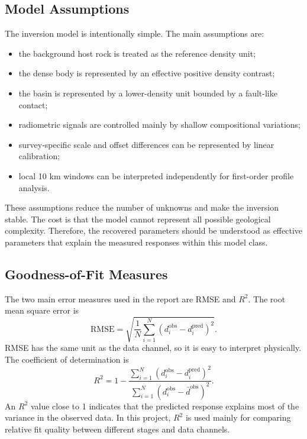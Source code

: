 \documentclass[12pt,a4paper]{article}
\begin{document}
\subsection{Model Assumptions}
The inversion model is intentionally simple. The main assumptions are:
\begin{itemize}
    \item the background host rock is treated as the reference density unit;
    \item the dense body is represented by an effective positive density contrast;
    \item the basin is represented by a lower-density unit bounded by a fault-like contact;
    \item radiometric signals are controlled mainly by shallow compositional variations;
    \item survey-specific scale and offset differences can be represented by linear calibration;
    \item local 10 km windows can be interpreted independently for first-order profile analysis.
\end{itemize}
These assumptions reduce the number of unknowns and make the inversion stable. The cost is that the model cannot represent all possible geological complexity. Therefore, the recovered parameters should be understood as effective parameters that explain the measured responses within this model class.

\subsection{Goodness-of-Fit Measures}
The two main error measures used in the report are RMSE and $R^2$. The root mean square error is
\begin{equation}
    \mathrm{RMSE}
    =
    \sqrt{
    \frac{1}{N}
    \sum_{i=1}^{N}
    \left(d_i^{\mathrm{obs}}-d_i^{\mathrm{pred}}\right)^2
    } .
\end{equation}
RMSE has the same unit as the data channel, so it is easy to interpret physically. The coefficient of determination is
\begin{equation}
    R^2
    =
    1 -
    \frac{
    \sum_{i=1}^{N}
    \left(d_i^{\mathrm{obs}}-d_i^{\mathrm{pred}}\right)^2
    }{
    \sum_{i=1}^{N}
    \left(d_i^{\mathrm{obs}}-\bar{d}^{\mathrm{obs}}\right)^2
    } .
\end{equation}
An $R^2$ value close to 1 indicates that the predicted response explains most of the variance in the observed data. In this project, $R^2$ is used mainly for comparing relative fit quality between different stages and data channels.
\end{document}
